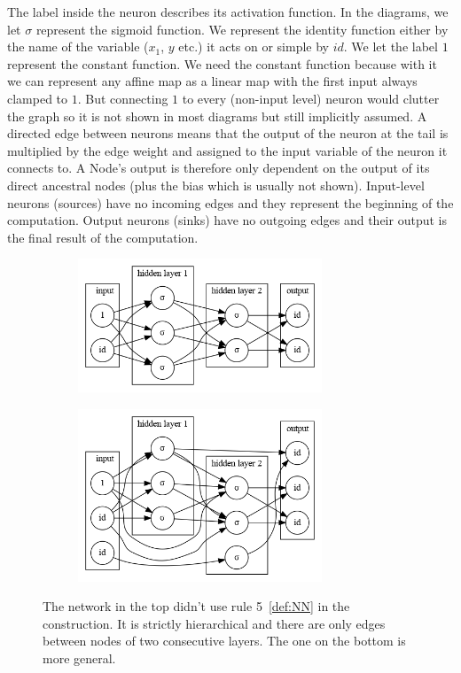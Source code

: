 \documentclass[11pt, a4paper]{report}
\theoremstyle{plain}
\theoremstyle{definition}
\theoremstyle{remark}
\begin{document}
The label inside the neuron describes its activation function.
In the diagrams, we let $\sigma$ represent the sigmoid function.
We represent the identity function either by the name of the variable ($x_1$,
$y$ etc.) it acts on or simple by 
$id$.   We let the label $1$ represent the constant function. We need the
constant function because with it we can represent any affine map as a linear
map with the first input always clamped to $1$. But connecting $1$ to every
(non-input level) neuron would clutter the graph so it is not shown in most
diagrams but still implicitly assumed.
A directed edge between neurons means that the output of the neuron at the tail
is multiplied by the edge weight and assigned to the input variable of the
neuron it connects to.
A Node's output is therefore only dependent on the output of its direct
ancestral nodes 
(plus the bias which is usually not shown).
Input-level neurons (sources) have no incoming edges and they represent the
beginning of the
computation.
Output neurons (sinks) have no outgoing edges and their output is the final result of
the computation.


\begin{figure}[!h]
\begin{framed}
\centering
\begin{subfigure}[b]{0.5\textwidth}
\includegraphics[width=0.8\textwidth]{./plots/neuronlayers.gv.png}
\end{subfigure}
\begin{subfigure}[b]{0.5\textwidth}
\includegraphics[width=0.8\textwidth]{./plots/neuronlayers.2.gv.png}
\end{subfigure}
\caption{The network in the top didn't use rule 5~\ref{def:NN} in the construction.
It is strictly hierarchical and there are only edges between nodes of two
consecutive layers. The one on the bottom is more general.
}
\label{fig:nn1}
\end{framed}
\end{figure}
\end{document}
